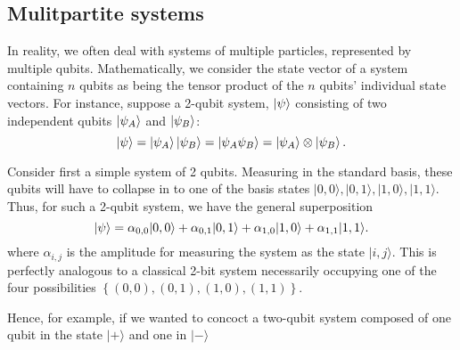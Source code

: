 \subsection{Mulitpartite systems}\label{sec:multipartite}
In reality, we often deal with systems of multiple particles, represented by multiple qubits. 
Mathematically, we consider the state vector of a system containing $n$ qubits as being the tensor product of the $n$ qubits' individual state vectors\footnotemark.
For instance, suppose a 2-qubit system, $\ket{\psi}$ consisting of two independent qubits $\ket{\psi_A}$ and $\ket{\psi_B}$: 
\begin{equation}\label{two_qubit_state}
    \ket{\psi}  = \ket{\psi_A} \ket{\psi_B} = \ket{\psi_A \psi_B} = \ket{\psi_A} \otimes \ket{\psi_B}.
\end{equation}

Consider first a simple system of 2 qubits. Measuring in the standard basis, these qubits will have to collapse in to one of the basis states $|0,0 \rangle, |0,1 \rangle, |1,0\rangle, |1,1\rangle $. Thus, for such a 2-qubit system, we have the general superposition
$$ \ket{\psi} = \alpha_{0,0} |0,0 \rangle + \alpha_{0,1}|0,1 \rangle + \alpha_{1,0} |1,0\rangle +\alpha_{1,1} |1,1\rangle. $$ 
where $\alpha_{i,j}$ is the amplitude for measuring the system as the state $|i,j\rangle $. 
This is perfectly analogous to a classical 2-bit system necessarily occupying one of the four possibilities $\left\{ (0,0), (0,1), (1,0), (1,1) \right\}$.

Hence, for example, if we wanted to concoct a two-qubit system composed of one qubit in the state $|+\rangle$ and one in $|-\rangle$

